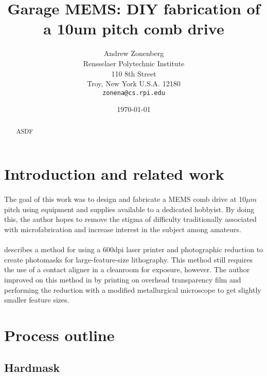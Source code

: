 \documentclass[twocolumn]{article}
\begin{document}
\title{Garage MEMS: DIY fabrication of a 10um pitch comb drive}
\author{Andrew Zonenberg\\
	Rensselaer Polytechnic Institute\\
	110 8th Street\\
	Troy, New York U.S.A. 12180\\
	\texttt{zonena@cs.rpi.edu}}
\date{\today}
\maketitle

\begin{abstract}
\paragraph*{}
ASDF
\end{abstract}

\section{Introduction and related work}
\paragraph*{}
The goal of this work was to design and fabricate a MEMS comb drive at 10$\mu m$ pitch using
equipment and supplies available to a dedicated hobbyist. By doing this, the author hopes to remove
the stigma of difficulty traditionally associated with microfabrication and increase interest in the
subject among amateurs.

\paragraph*{}
\cite{OfficePrint} describes a method for using a 600dpi laser printer and photographic reduction to
create photomasks for large-feature-size lithography. This method still requires the use of a
contact aligner in a cleanroom for exposure, however. The author improved on this method in
\cite{DiyFab} by printing on overhead transparency film and performing the reduction with a
modified metallurgical microscope to get slightly smaller feature sizes.

\section{Process outline}

\subsection{Hardmask}
\end{document}
